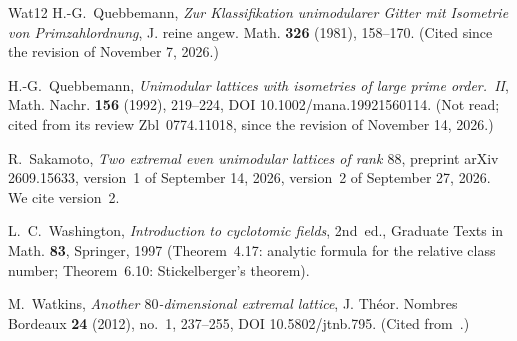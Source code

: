 \documentclass[11pt,a4paper]{amsart}
\theoremstyle{plain}
\theoremstyle{definition}
\numberwithin{equation}{section}
\begin{document}
\begin{thebibliography}{Wat12}
H.-G.~Quebbemann, \emph{Zur Klassifikation unimodularer Gitter mit Isometrie von Primzahlordnung}, J. reine angew. Math. \textbf{326} (1981), 158--170. (Cited since the revision of November 7, 2026.)

H.-G.~Quebbemann, \emph{Unimodular lattices with isometries of large prime order.~II}, Math. Nachr. \textbf{156} (1992), 219--224, DOI 10.1002/mana.19921560114. (Not read; cited from its review Zbl~0774.11018, since the revision of November 14, 2026.)

R.~Sakamoto, \emph{Two extremal even unimodular lattices of rank $88$}, preprint arXiv 2609.15633, version~1 of September 14, 2026, version~2 of September 27, 2026. We cite version~2.

L.~C.~Washington, \emph{Introduction to cyclotomic fields}, 2nd~ed., Graduate Texts in Math. \textbf{83}, Springer, 1997 (Theorem~4.17: analytic formula for the relative class number; Theorem~6.10: Stickelberger's theorem).

M.~Watkins, \emph{Another $80$-dimensional extremal lattice}, J. Th\'eor. Nombres Bordeaux \textbf{24} (2012), no.~1, 237--255, DOI 10.5802/jtnb.795. (Cited from~\cite{Sak26}.)

\end{thebibliography}
\end{document}
